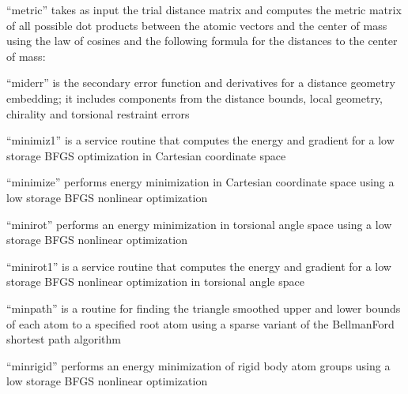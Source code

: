 \documentclass[letterpaper,11pt,english]{sphinxmanual}
\begin{document}
\sphinxAtStartPar
{}

\sphinxAtStartPar
“metric” takes as input the trial distance matrix and computes the metric matrix of all possible dot products between the atomic vectors and the center of mass using the law of cosines and the following formula for the distances to the center of mass:

\sphinxAtStartPar
{}

\sphinxAtStartPar
“miderr” is the secondary error function and derivatives for a distance geometry embedding; it includes components from the distance bounds, local geometry, chirality and torsional restraint errors

\sphinxAtStartPar
{}

\sphinxAtStartPar
“minimiz1” is a service routine that computes the energy and gradient for a low storage BFGS optimization in Cartesian coordinate space

\sphinxAtStartPar
{}

\sphinxAtStartPar
“minimize” performs energy minimization in Cartesian coordinate space using a low storage BFGS nonlinear optimization

\sphinxAtStartPar
{}

\sphinxAtStartPar
“minirot” performs an energy minimization in torsional angle space using a low storage BFGS nonlinear optimization

\sphinxAtStartPar
{}

\sphinxAtStartPar
“minirot1” is a service routine that computes the energy and gradient for a low storage BFGS nonlinear optimization in torsional angle space

\sphinxAtStartPar
{}

\sphinxAtStartPar
“minpath” is a routine for finding the triangle smoothed upper and lower bounds of each atom to a specified root atom using a sparse variant of the Bellman\sphinxhyphen{}Ford shortest path algorithm

\sphinxAtStartPar
{}

\sphinxAtStartPar
“minrigid” performs an energy minimization of rigid body atom groups using a low storage BFGS nonlinear optimization

\sphinxAtStartPar
{}
\end{document}
